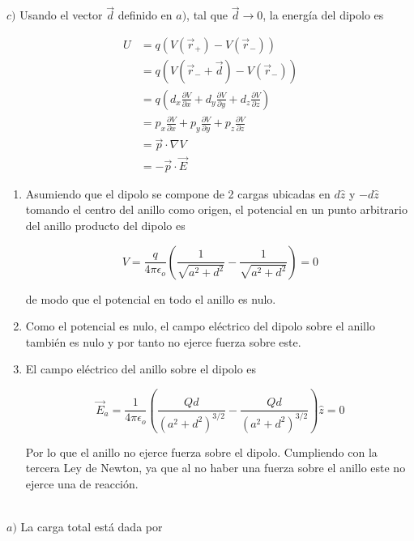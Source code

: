$c)$ Usando el vector $\Vec{d}$ definido en $a)$, tal que $\Vec{d}\to 0$, la energía del dipolo es

\begin{equation}
\begin{split}
    U &= q(V(\Vec{r}_{+})-V(\Vec{r}_{-}))\\
    &= q(V(\Vec{r}_{-}+\Vec{d})-V(\Vec{r}_{-}))\\
    &= q(d_x\frac{\partial V}{\partial x}+d_y\frac{\partial V}{\partial y}+d_z\frac{\partial V}{\partial z})\\
    &= p_x\frac{\partial V}{\partial x}+p_y\frac{\partial V}{\partial y}+p_z\frac{\partial V}{\partial z}\\
    &= \Vec{p}\cdot\nabla V\\
    &= -\Vec{p}\cdot\Vec{E}
\end{split}
\nonumber
\end{equation}
\bigbreak

\bigbreak

\bigbreak
\begin{enumerate}[label=\alph*)]
    \item Asumiendo que el dipolo se compone de 2 cargas ubicadas en $d\hat{z}$ y $-d\hat{z}$ tomando el centro del anillo como origen, el potencial en un punto arbitrario del anillo producto del dipolo es
    
    \[V = \frac{q}{4\pi\epsilon_o}\left(\frac{1}{\sqrt{a^2+d^2}} -\frac{1}{\sqrt{a^2+d^2}}\right)=0\]
    
    de modo que el potencial en todo el anillo es nulo.
    
    \item Como el potencial es nulo, el campo eléctrico del dipolo sobre el anillo también es nulo y por tanto no ejerce fuerza sobre este.
    
    \item El campo eléctrico del anillo sobre el dipolo es

    \[\Vec{E}_a = \frac{1}{4\pi\epsilon_o}\left( \frac{Qd}{(a^2+d^2)^{3/2}}-\frac{Qd}{(a^2+d^2)^{3/2}} \right)\hat{z}=0\]

    Por lo que el anillo no ejerce fuerza sobre el dipolo. Cumpliendo con la tercera Ley de Newton, ya que al no haber una fuerza sobre el anillo este no ejerce una de reacción.

\end{enumerate}
\bigbreak
\bigbreak
{}\\
\bigbreak
$a)$ La carga total está dada por

